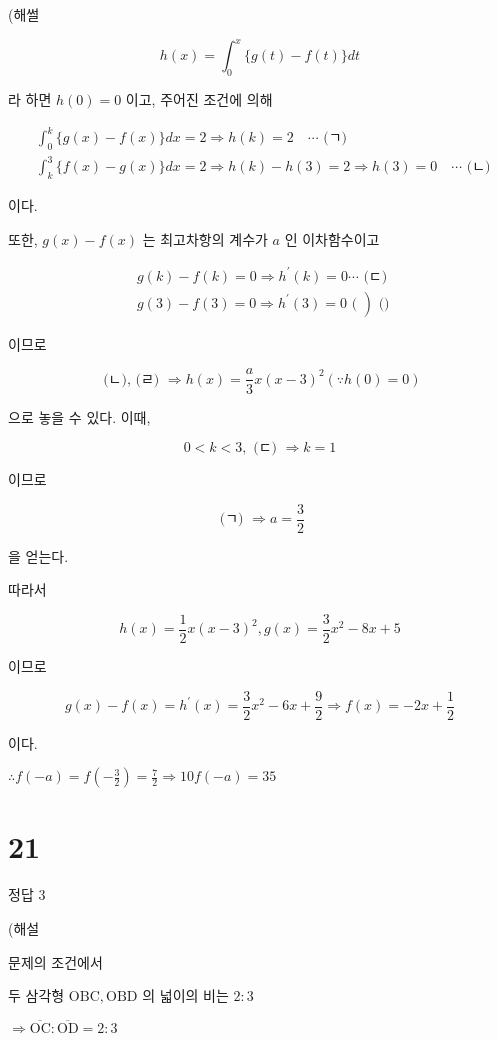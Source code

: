 \documentclass[10pt]{article}
\begin{document}
(해썰

\[
h(x)=\int_{0}^{x}\{g(t)-f(t)\} d t
\]

라 하면 \(h(0)=0\) 이고, 주어진 조건에 의해

\[
\begin{aligned}
& \int_{0}^{k}\{g(x)-f(x)\} d x=2 \Rightarrow h(k)=2 \quad \cdots \text { (ㄱ) } \\
& \int_{k}^{3}\{f(x)-g(x)\} d x=2 \Rightarrow h(k)-h(3)=2 \Rightarrow h(3)=0 \quad \cdots \text { (ㄴ) }
\end{aligned}
\]

이다.

또한, \(g(x)-f(x)\) 는 최고차항의 계수가 \(a\) 인 이차함수이고

\[
\begin{aligned}
& g(k)-f(k)=0 \Rightarrow h^{\prime}(k)=0 \cdots \text { (ㄷ) } \\
& \left.g(3)-f(3)=0 \Rightarrow h^{\prime}(3)=0 \text { ( }\right) \text { () }
\end{aligned}
\]

이므로

\[
\text { (ㄴ), (ㄹ) } \Rightarrow h(x)=\frac{a}{3} x(x-3)^{2}(\because h(0)=0)
\]

으로 놓을 수 있다. 이때,

\[
0<k<3, \text { (ㄷ) } \Rightarrow k=1
\]

이므로

\[
\text { (ㄱ) } \Rightarrow a=\frac{3}{2}
\]

을 얻는다.

따라서

\[
h(x)=\frac{1}{2} x(x-3)^{2}, g(x)=\frac{3}{2} x^{2}-8 x+5
\]

이므로

\[
g(x)-f(x)=h^{\prime}(x)=\frac{3}{2} x^{2}-6 x+\frac{9}{2} \Rightarrow f(x)=-2 x+\frac{1}{2}
\]

이다.

\(\therefore f(-a)=f\left(-\frac{3}{2}\right)=\frac{7}{2} \Rightarrow 10 f(-a)=35\)

\section*{21}
정답 3

(해설

문제의 조건에서

두 삼각형 \(\mathrm{OBC}, \mathrm{OBD}\) 의 넓이의 비는 \(2: 3\)

\(\Rightarrow \overline{\mathrm{OC}}: \overline{\mathrm{OD}}=2: 3\)
\end{document}
